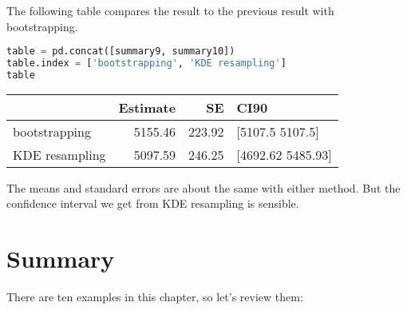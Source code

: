 The following table compares the result to the previous result with
bootstrapping.

\begin{lstlisting}[language=Python,style=source]
table = pd.concat([summary9, summary10])
table.index = ['bootstrapping', 'KDE resampling']
table
\end{lstlisting}

\begin{tabular}{lrrl}
\toprule
 & Estimate & SE & CI90 \\
\midrule
bootstrapping & 5155.46 & 223.92 & [5107.5 5107.5] \\
KDE resampling & 5097.59 & 246.25 & [4692.62 5485.93] \\
\bottomrule
\end{tabular}

The means and standard errors are about the same with either method. But
the confidence interval we get from KDE resampling is sensible.

\pagebreak

\section{Summary}\label{summary}

There are ten examples in this chapter, so let's review them:


